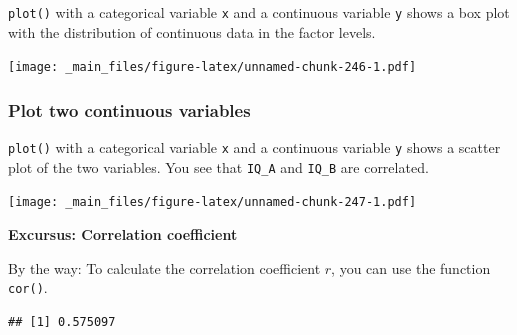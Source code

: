 \documentclass[
]{scrartcl}
\newenvironment{Shaded}{\begin{snugshade}}{\end{snugshade}}
\newcommand{\AttributeTok}[1]{\textcolor[rgb]{0.13,0.29,0.53}{#1}}
\newcommand{\FunctionTok}[1]{\textcolor[rgb]{0.13,0.29,0.53}{\textbf{#1}}}
\newcommand{\NormalTok}[1]{#1}
\newcommand{\SpecialCharTok}[1]{\textcolor[rgb]{0.81,0.36,0.00}{\textbf{#1}}}
\newenvironment{webexsolution}[1]
    {\par\tiny\textbf{#1}}
    {\par}
\newcommand{\webexhide}[1]{\begin{webexsolution}{#1}}
\begin{document}
\texttt{plot()} with a categorical variable \texttt{x} and a continuous variable \texttt{y} shows a box plot with the distribution of continuous data in the factor levels.

\begin{Shaded}
\end{Shaded}

\texttt{[image: \_main\_files/figure-latex/unnamed-chunk-246-1.pdf]}

\hypertarget{plot-two-continuous-variables}{%
\subsubsection{Plot two continuous variables}\label{plot-two-continuous-variables}}

\texttt{plot()} with a categorical variable \texttt{x} and a continuous variable \texttt{y} shows a scatter plot of the two variables. You see that \texttt{IQ\_A} and \texttt{IQ\_B} are correlated.

\begin{Shaded}
\end{Shaded}

\texttt{[image: \_main\_files/figure-latex/unnamed-chunk-247-1.pdf]}
\webexhide{Excursus: Correlation coefficient}

By the way: To calculate the correlation coefficient \(r\), you can use the function \texttt{cor()}.

\begin{Shaded}
\end{Shaded}

\begin{verbatim}
## [1] 0.575097
\end{verbatim}
\end{document}
